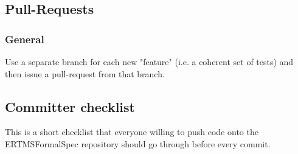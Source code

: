 \documentclass[draft]{efsguide}
\begin{document}
\section{Pull-Requests}
\label{sec:pull_request}
\subsection{General}
\begin{rules}

\item Use a separate branch for each new "feature" (i.e. a coherent set of tests) and then issue a pull-request from that branch. 

\end{rules}

\begin{appendices}

\chapter{Committer checklist}
\label{appendix:committer_checklist}
This is a short checklist that everyone willing to push code onto the ERTMSFormalSpec repository should go through before every commit.


\end{appendices}
\end{document}
